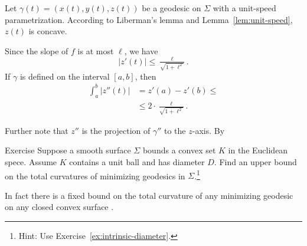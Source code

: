 Let $\gamma(t)=(x(t),y(t),z(t))$ be a geodesic on $\Sigma$ with a unit-speed parametrization.
According to Liberman's lemma and Lemma~\ref{lem:unit-speed},
$z(t)$ is concave.

Since the slope of $f$ is at most $\ell$, we have
\[|z'(t)|\le \tfrac{\ell}{\sqrt{1+\ell^2}}.\]
If $\gamma$ is defined on the interval $[a,b]$, then
\begin{align*}
\int_a^b |z''(t)|&=z'(a)-z'(b)\le 
\\
&\le 2\cdot \tfrac{\ell}{\sqrt{1+\ell^2}}.
\end{align*}

Further note that $z''$ is the projection of $\gamma''$ to the $z$-axis.
By 
\qeds

\begin{thm}{Exercise} Suppose a smooth surface $\Sigma$ bounds a convex set $K$ in the Euclidean spece.
Assume $K$ contains a unit ball and has diameter $D$.
Find an upper bound on the total curvatures of minimizing geodesics in $\Sigma$.\footnote{Hint: Use Exercise~\ref{ex:intrinsic-diameter}.}
\end{thm}

In fact there is a fixed bound on the total curvature of any minimizing geodesic on any closed convex surface \cite{lebedeva-petrunin}.

